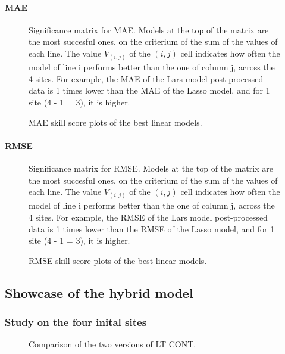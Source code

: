 \paragraph{MAE}
\begin{figure}[htb!]
    \centering
    
\caption{Significance matrix for MAE. Models at the top of the matrix are the most succesful ones, on the criterium of the sum of the values of each line. The value $V_{(i,j)}$ of the $(i,j)$ cell indicates how often the model of line i performs better than the one of column j, across the 
4 sites. For example, the MAE of the Lars model post-processed data is 1 times lower than the MAE of the Lasso model, and for 1 site (4 - 1 = 3), it is higher.}
\end{figure}

\begin{figure}[htb!]
    \centering
    
\caption{MAE skill score plots of the best linear models.}
\end{figure}


\paragraph{RMSE}
\begin{figure}[htb!]
    \centering
    
\caption{Significance matrix for RMSE. Models at the top of the matrix are the most succesful ones, on the criterium of the sum of the values of each line. The value $V_{(i,j)}$ of the $(i,j)$ cell indicates how often the model of line i performs better than the one of column j, across the 
4 sites. For example, the RMSE of the Lars model post-processed data is 1 times lower than the RMSE of the Lasso model, and for 1 site (4 - 1 = 3), it is higher.}
\end{figure}

\begin{figure}[htb!]
    \centering
    
\caption{RMSE skill score plots of the best linear models.}
\end{figure}
\subsection{Showcase of the hybrid model}
\subsubsection{Study on the four inital sites}
\begin{figure}[htb!]
    \centering
    
\caption{Comparison of the two versions of LT CONT.}
\end{figure}
